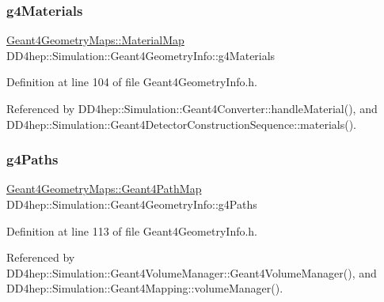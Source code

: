 \subsubsection{\texorpdfstring{g4\+Materials}{g4Materials}}
{\footnotesize\ttfamily \hyperlink{namespace_d_d4hep_1_1_simulation_1_1_geant4_geometry_maps_a0ae377c64e684c47bd3045a9d3d8e248}{Geant4\+Geometry\+Maps\+::\+Material\+Map} D\+D4hep\+::\+Simulation\+::\+Geant4\+Geometry\+Info\+::g4\+Materials}



Definition at line 104 of file Geant4\+Geometry\+Info.\+h.



Referenced by D\+D4hep\+::\+Simulation\+::\+Geant4\+Converter\+::handle\+Material(), and D\+D4hep\+::\+Simulation\+::\+Geant4\+Detector\+Construction\+Sequence\+::materials().

\hypertarget{class_d_d4hep_1_1_simulation_1_1_geant4_geometry_info_a526d06afb77ac403965f2bb6c55998de}{}\label{class_d_d4hep_1_1_simulation_1_1_geant4_geometry_info_a526d06afb77ac403965f2bb6c55998de} 
\subsubsection{\texorpdfstring{g4\+Paths}{g4Paths}}
{\footnotesize\ttfamily \hyperlink{namespace_d_d4hep_1_1_simulation_1_1_geant4_geometry_maps_a3d68bbc4e8d7a581a15f66d773dac6e7}{Geant4\+Geometry\+Maps\+::\+Geant4\+Path\+Map} D\+D4hep\+::\+Simulation\+::\+Geant4\+Geometry\+Info\+::g4\+Paths}



Definition at line 113 of file Geant4\+Geometry\+Info.\+h.



Referenced by D\+D4hep\+::\+Simulation\+::\+Geant4\+Volume\+Manager\+::\+Geant4\+Volume\+Manager(), and D\+D4hep\+::\+Simulation\+::\+Geant4\+Mapping\+::volume\+Manager().

\hypertarget{class_d_d4hep_1_1_simulation_1_1_geant4_geometry_info_aa99d9cc649a22de3dc3f05f07558951a}{}\label{class_d_d4hep_1_1_simulation_1_1_geant4_geometry_info_aa99d9cc649a22de3dc3f05f07558951a} 
